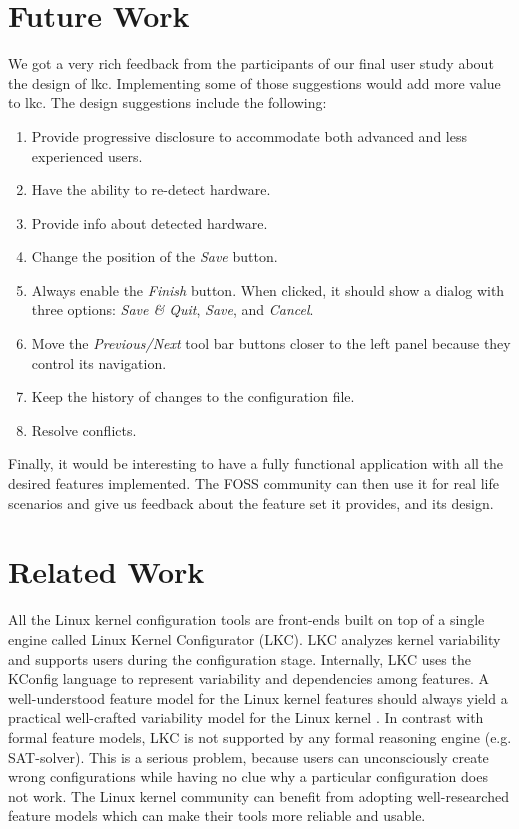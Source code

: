 \documentclass{chi2009}
\begin{document}
\section{Future Work}\label{sec:futurework}
We got a very rich feedback from the participants of our final user study about the design of \textsf{lkc}. Implementing some of those suggestions would add
more value to \textsf{lkc}. The design suggestions include the following:
\begin{enumerate}
 \item Provide progressive disclosure to accommodate both advanced and less experienced users.
 \item Have the ability to re-detect hardware.
 \item Provide info about detected hardware.
 \item Change the position of the \textit{Save} button.
 \item Always enable the \textit{Finish} button. When clicked, it should show a dialog with three options: \textit{Save \& Quit}, \textit{Save}, and
\textit{Cancel}.
 \item Move the \textit{Previous/Next} tool bar buttons closer to the left panel because they control its navigation.
 \item Keep the history of changes to the configuration file.
 \item Resolve conflicts.
\end{enumerate}

Finally, it would be interesting to have a fully functional application with all the desired features implemented. The FOSS community can then use it for real
life scenarios and give us feedback about the feature set it provides, and its design.

\section{Related Work}\label{sec:relatedwork}

All the Linux kernel configuration tools are front-ends built on top of a single engine called Linux Kernel Configurator (LKC). LKC analyzes kernel variability
and supports users during the configuration stage. Internally, LKC uses the KConfig language to represent variability and dependencies among features.
A well-understood feature model for the Linux kernel features should always yield a practical well-crafted variability model for the Linux kernel
\cite{sincero:lkc:2008,she:kernel:2010}. In contrast with formal feature models, LKC is not supported by any formal reasoning engine (e.g. SAT-solver). This is
a serious problem, because users can unconsciously create wrong configurations while having no clue why a particular configuration does not work. The Linux
kernel community can benefit from adopting well-researched feature models which can make their tools more reliable and usable.
\end{document}
